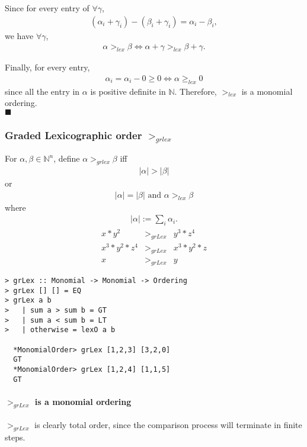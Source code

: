 \documentclass[11pt]{book}
\begin{document}
Since for every entry of $\forall \gamma$, 
\begin{eqnarray}
(\alpha_i + \gamma_i) - (\beta_i + \gamma_i) = \alpha_i  - \beta_i,
\end{eqnarray}
we have $\forall \gamma$, 
\begin{eqnarray}
\alpha >_{lex} \beta \Leftrightarrow \alpha + \gamma >_{lex} \beta + \gamma.
\end{eqnarray}

Finally, for every entry,
\begin{eqnarray}
\alpha_i = \alpha_i - 0 \geq 0 \Leftrightarrow \alpha \geq_{lex} 0
\end{eqnarray}
since all the entry in $\alpha$ is positive definite in $\mathbb{N}$.
Therefore, $>_{lex}$ is a monomial ordering.\\
$\blacksquare$

\subsubsection{Graded Lexicographic order $>_{grlex}$}
For $\alpha, \beta \in \mathbb{N}^n$, define $\alpha >_{grlex} \beta$ iff
\begin{eqnarray}
|\alpha| > |\beta|
\end{eqnarray}
or
\begin{eqnarray}
|\alpha| = |\beta| \text{ and } \alpha >_{lex} \beta
\end{eqnarray}
where
\begin{eqnarray}
|\alpha| := \sum_{i} \alpha_i.
\end{eqnarray}
\begin{eqnarray}
x * y^2 &>_{grLex}& y^3 * z^4 \\
x^3 * y^2 * z^4 &>_{grLex}& x^3 * y^2 * z \\
x &>_{grLex}& y
\end{eqnarray}

\begin{verbatim}
> grLex :: Monomial -> Monomial -> Ordering
> grLex [] [] = EQ
> grLex a b
>   | sum a > sum b = GT
>   | sum a < sum b = LT
>   | otherwise = lexO a b
  
  *MonomialOrder> grLex [1,2,3] [3,2,0]
  GT
  *MonomialOrder> grLex [1,2,4] [1,1,5]
  GT
\end{verbatim}

\paragraph{$>_{grLex}$ is a monomial ordering}
$>_{grLex}$ is clearly total order, since the comparison process will terminate in finite steps.
\end{document}
